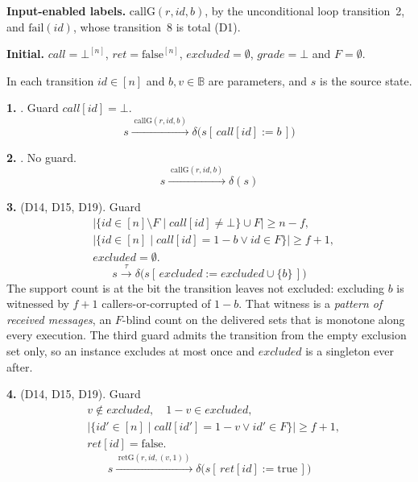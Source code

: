 \noindent\textbf{Input-enabled labels.}
$\mathrm{callG}(r,id,b)$, by the unconditional loop transition~2, and $\mathrm{fail}(id)$, whose transition~8 is total (D1).

\noindent\textbf{Initial.}
$call = \bot^{[n]}$, $ret = \mathrm{false}^{[n]}$, $excluded = \emptyset$, $grade = \bot$ and $F = \emptyset$.

\medskip
\noindent In each transition $id \in [n]$ and $b, v \in \mathbb{B}$ are parameters, and $s$ is the source state.

\medskip
\noindent\textbf{1.} .
Guard $call[id] = \bot$.
\[ s \xrightarrow{\;\mathrm{callG}(r,id,b)\;} \delta\bigl(s[\,call[id] := b\,]\bigr) \]

\noindent\textbf{2.} .
No guard.
\[ s \xrightarrow{\;\mathrm{callG}(r,id,b)\;} \delta(s) \]

\noindent\textbf{3.}  (D14, D15, D19).
Guard
\[ \begin{aligned}
     &\bigl|\{id \in [n]\setminus F \mid call[id] \neq \bot\} \cup F\bigr| \ge n - f,\\
     &\bigl|\{id \in [n] \mid call[id] = 1-b \vee id \in F\}\bigr| \ge f + 1,\\
     &excluded = \emptyset.
   \end{aligned} \]
\[ s \xrightarrow{\;\tau\;} \delta\bigl(s[\,excluded := excluded \cup \{b\}\,]\bigr) \]
\noindent The support count is at the bit the transition leaves not excluded: excluding $b$ is witnessed by $f{+}1$ callers-or-corrupted of $1-b$.
That witness is a \emph{pattern of received messages}, an $F$-blind count on the delivered sets that is monotone along every execution.
The third guard admits the transition from the empty exclusion set only, so an instance excludes at most once and $excluded$ is a singleton ever after.

\noindent\textbf{4.}  (D14, D15, D19).
Guard
\[ \begin{aligned}
     &v \notin excluded,\quad 1-v \in excluded,\\
     &\bigl|\{id' \in [n] \mid call[id'] = 1-v \vee id' \in F\}\bigr| \ge f + 1,\\
     &ret[id] = \mathrm{false}.
   \end{aligned} \]
\[ s \xrightarrow{\;\mathrm{retG}(r,id,(v,1))\;}
   \delta\bigl(s[\,ret[id] := \mathrm{true}\,]\bigr) \]

